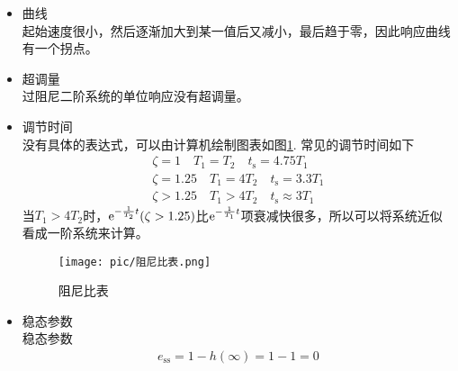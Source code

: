 \begin{itemize}
	\item 曲线\\
	\hspace*{2em} 起始速度很小，然后逐渐加大到某一值后又减小，最后趋于零，因此响应曲线有一个拐点。
	\item 超调量\\
	\hspace*{2em} 过阻尼二阶系统的单位响应没有超调量。
	\item 调节时间\\
	\hspace*{2em} 没有具体的表达式，可以由计算机绘制图表如图\ref{阻尼比表}.
	常见的调节时间如下
	\begin{align*}
		\zeta = 1 \quad T_1 = T_2 \quad t_\text{s} = 4.75T_1\\
		\zeta = 1.25 \quad T_1 = 4T_2 \quad t_\text{s} = 3.3T_1\\
		\zeta > 1.25 \quad T_1 > 4 T_2 \quad t_\text{s} \approx 3 T_1
	\end{align*}
	当$T_1 > 4T_2
	$时，${\rm{e}}^{-\frac{1}{T_2}t}(\zeta > 1.25)$比${\rm{e}}^{-\frac{1}{T_1}t}$项衰减快很多，所以可以将系统近似看成一阶系统来计算。
	\begin{figure}[!htb]
		\centering 
		\texttt{[image: pic/阻尼比表.png]}
		\vspace*{-1em}
		\caption{\quad 阻尼比表}
		\label{阻尼比表}
	\end{figure}
	\item 稳态参数\\
	\hspace*{2em} 稳态参数
	\begin{align*}
		e_{\text{ss}} = 1 - h(\infty) = 1 -1 =0
	\end{align*}
\end{itemize}
 
